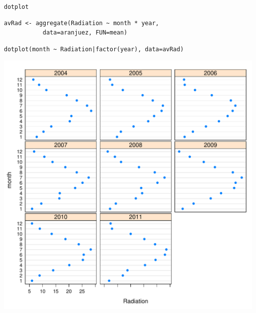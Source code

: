 \documentclass[xcolor={usenames,svgnames,dvipsnames}]{beamer}
\begin{document}
\begin{frame}[fragile,label=sec-2-1-24]{\texttt{dotplot}}
 \lstset{language=R,numbers=none}
\begin{lstlisting}
avRad <- aggregate(Radiation ~ month * year,
		   data=aranjuez, FUN=mean)
\end{lstlisting}

\lstset{language=R,numbers=none}
\begin{lstlisting}
dotplot(month ~ Radiation|factor(year), data=avRad)
\end{lstlisting}

\includegraphics[width=.9\linewidth]{figs/dotplot.pdf}
\end{frame}
\end{document}
